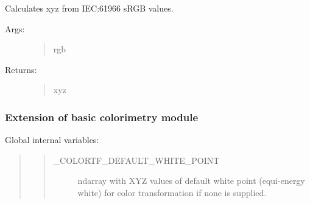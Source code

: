 \documentclass[letterpaper,10pt,english]{sphinxmanual}
\begin{document}
\begin{fulllineitems}
\label{\detokenize{color:luxpy.color.ctf.colortransforms.srgb_to_xyz}}
Calculates xyz from IEC:61966 sRGB values.
\begin{description}
\item[{Args:}] \leavevmode\begin{quote}\begin{description}
\item[{rgb}] \leavevmode
{}

\end{description}\end{quote}

\item[{Returns:}] \leavevmode\begin{quote}\begin{description}
\item[{xyz}] \leavevmode
{}

\end{description}\end{quote}

\end{description}

\end{fulllineitems}

\label{\detokenize{color:module-luxpy.color.ctf.colortf}}

\subsubsection{Extension of basic colorimetry module}
\label{\detokenize{color:extension-of-basic-colorimetry-module}}
Global internal variables:
\begin{quote}
\begin{quote}\begin{description}
\item[{\_COLORTF\_DEFAULT\_WHITE\_POINT}] \leavevmode
ndarray with XYZ values of default white point 
(equi-energy white) for color transformation 
if none is supplied.

\end{description}\end{quote}
\end{quote}
\end{document}

